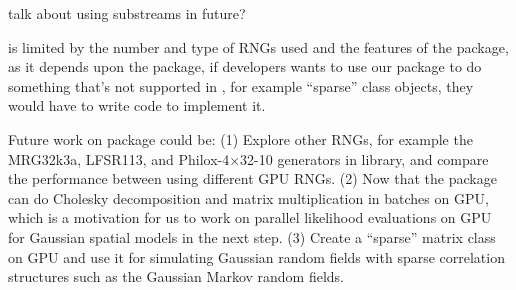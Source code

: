 \documentclass[article,nojss]{jss}\usepackage[]{graphicx}\usepackage[]{color}
\begin{document}
talk about using substreams in future?




 is limited by the number and type of  RNGs used and the features of the  package, as it depends upon the  package, if developers wants to use our package to do something that's not supported in , for example ``sparse'' class objects, they would have to write  code to implement it.

Future work on  package could be: (1) Explore other RNGs, for example the MRG32k3a, LFSR113, and Philox-4×32-10 generators in  library, and compare the  performance between using different GPU RNGs. (2) Now that the package can do Cholesky decomposition and matrix multiplication in batches on GPU, which is a motivation for us to work on parallel likelihood evaluations on GPU for Gaussian spatial models in the next step. (3) Create a ``sparse'' matrix class on GPU and use it for simulating Gaussian random fields with sparse correlation structures such as the Gaussian Markov random fields.










\newpage

\begin{appendix}


\end{appendix}
\end{document}
